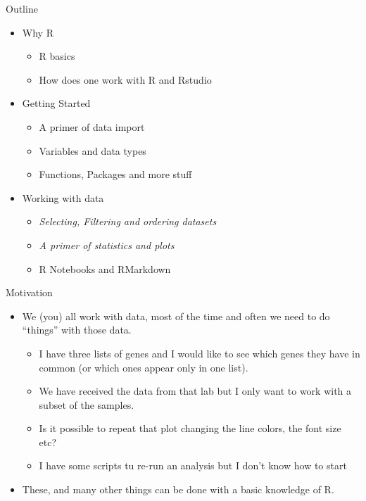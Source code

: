\documentclass[
  ignorenonframetext,
]{beamer}
\providecommand{\tightlist}{%
  \setlength{\itemsep}{0pt}\setlength{\parskip}{0pt}}
\begin{document}
\begin{frame}{Outline}
\protect\hypertarget{outline}{}
\begin{itemize}
\tightlist
\item
  Why R

  \begin{itemize}
  \tightlist
  \item
    R basics
  \item
    How does one work with R and Rstudio
  \end{itemize}
\item
  Getting Started

  \begin{itemize}
  \tightlist
  \item
    A primer of data import
  \item
    Variables and data types
  \item
    Functions, Packages and more stuff
  \end{itemize}
\item
  Working with data

  \begin{itemize}
  \tightlist
  \item
    \emph{Selecting, Filtering and ordering datasets}
  \item
    \emph{A primer of statistics and plots}
  \item
    R Notebooks and RMarkdown
  \end{itemize}
\end{itemize}
\end{frame}

\begin{frame}{Motivation}
\protect\hypertarget{motivation}{}
\begin{itemize}
\item
  We (you) all work with data, most of the time and often we need to do
  ``things'' with those data.

  \begin{itemize}
  \tightlist
  \item
    I have three lists of genes and I would like to see which genes they
    have in common (or which ones appear only in one list).
  \item
    We have received the data from that lab but I only want to work with
    a subset of the samples.
  \item
    Is it possible to repeat that plot changing the line colors, the
    font size etc?
  \item
    I have some scripts tu re-run an analysis but I don't know how to
    start
  \end{itemize}
\item
  These, and many other things can be done with a basic knowledge of R.
\end{itemize}
\end{frame}
\end{document}
